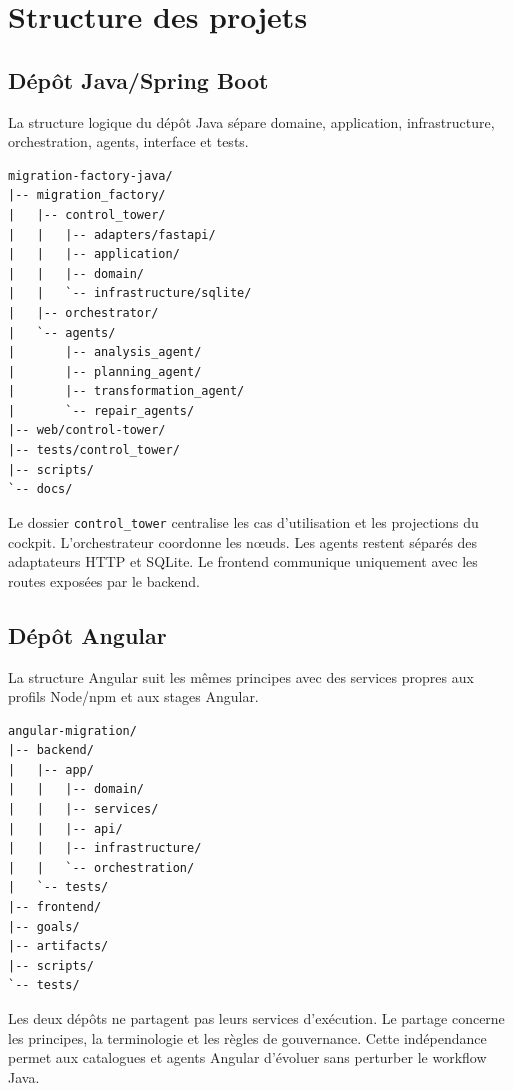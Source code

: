 \section{Structure des projets}

\subsection{Dépôt Java/Spring Boot}

La structure logique du dépôt Java sépare domaine, application, infrastructure, orchestration, agents, interface et tests.

\begin{verbatim}
migration-factory-java/
|-- migration_factory/
|   |-- control_tower/
|   |   |-- adapters/fastapi/
|   |   |-- application/
|   |   |-- domain/
|   |   `-- infrastructure/sqlite/
|   |-- orchestrator/
|   `-- agents/
|       |-- analysis_agent/
|       |-- planning_agent/
|       |-- transformation_agent/
|       `-- repair_agents/
|-- web/control-tower/
|-- tests/control_tower/
|-- scripts/
`-- docs/
\end{verbatim}

Le dossier \texttt{control\_tower} centralise les cas d'utilisation et les projections du cockpit. L'orchestrateur coordonne les nœuds. Les agents restent séparés des adaptateurs HTTP et SQLite. Le frontend communique uniquement avec les routes exposées par le backend.

\subsection{Dépôt Angular}

La structure Angular suit les mêmes principes avec des services propres aux profils Node/npm et aux stages Angular.

\begin{verbatim}
angular-migration/
|-- backend/
|   |-- app/
|   |   |-- domain/
|   |   |-- services/
|   |   |-- api/
|   |   |-- infrastructure/
|   |   `-- orchestration/
|   `-- tests/
|-- frontend/
|-- goals/
|-- artifacts/
|-- scripts/
`-- tests/
\end{verbatim}

Les deux dépôts ne partagent pas leurs services d'exécution. Le partage concerne les principes, la terminologie et les règles de gouvernance. Cette indépendance permet aux catalogues et agents Angular d'évoluer sans perturber le workflow Java.

